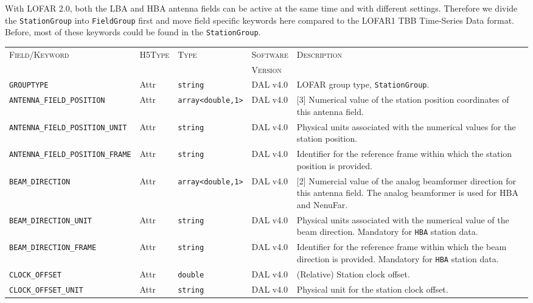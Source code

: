 \documentclass[a4paper,10pt,bibtotoc]{scrartcl}
\begin{document}
With LOFAR 2.0, both the LBA and HBA antenna fields can be active at the same time and with different settings. Therefore we divide the \texttt{StationGroup} into \texttt{FieldGroup} first and move field specific keywords here compared to the LOFAR1 TBB Time-Series Data format. Before, most of these keywords could be found in the \texttt{StationGroup}.

\begin{table}[htbp]
  \centering
  \begin{tabular}{|llllp{4.5cm}|}
    \hline
    \textsc{Field/Keyword} & \textsc{H5Type} & \textsc{Type} & \textsc{Software} & \textsc{Description} \\
                           &                 &               & \textsc{Version}  &                      \\
    \hline
    \hline
    \small {\texttt{GROUPTYPE}} & Attr & \verb|string| & DAL v4.0 & LOFAR group type, \texttt{StationGroup}. \\
    \small {\texttt{ANTENNA\_FIELD\_POSITION}} & Attr & \verb|array<double,1>| & DAL v4.0 & [3] Numerical value of the station position coordinates of this antenna field. \\
    \small {\texttt{ANTENNA\_FIELD\_POSITION\_UNIT}}  & Attr & \verb|string| & DAL v4.0 & Physical units associated with the numerical values for the station position. \\
    \small {\texttt{ANTENNA\_FIELD\_POSITION\_FRAME}} & Attr & \verb|string| & DAL v4.0 & Identifier for the reference frame within which the station position is provided. \\
    \small {\texttt{BEAM\_DIRECTION}} & Attr & \verb|array<double,1>| & DAL v4.0 & [2] Numercial value of the analog beamformer direction for this antenna field. The analog beamformer is used for HBA and NenuFar.\\
    \small {\texttt{BEAM\_DIRECTION\_UNIT}}  & Attr & \verb|string| & DAL v4.0 & Physical units associated with the numerical value of the beam direction. Mandatory for \verb|HBA| station data.\\
    \small {\texttt{BEAM\_DIRECTION\_FRAME}} & Attr & \verb|string| & DAL v4.0 & Identifier for the reference frame within which the beam direction is provided. Mandatory for \verb|HBA| station data.\\
    \small {\texttt{CLOCK\_OFFSET}} & Attr & \verb|double| & DAL v4.0 & (Relative) Station clock offset. \\
    \small {\texttt{CLOCK\_OFFSET\_UNIT}} & Attr & \verb|string| & DAL v4.0 & Physical unit for the station clock offset. \\

\end{tabular}
\end{table}
\end{document}
